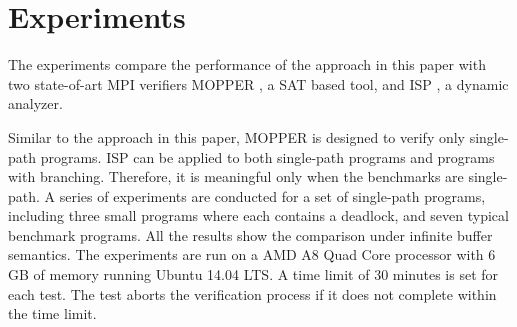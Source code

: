 \section{Experiments}
The experiments compare the performance of the approach in this paper with two state-of-art MPI verifiers MOPPER \cite{DBLP:conf/fm/ForejtKNS14}, a SAT based tool, and ISP \cite{DBLP:conf/ppopp/VakkalankaSGK08,DBLP:conf/sbmf/SharmaGB12}, a dynamic analyzer. 

Similar to the approach in this paper, MOPPER is designed to verify only single-path programs. ISP can be applied to both single-path programs and programs with branching. Therefore, it is meaningful only when the benchmarks are single-path.
A series of experiments are conducted for a set of single-path programs, including three small programs where each contains a deadlock, and seven typical benchmark programs. All the results show the comparison under infinite buffer semantics.  
The experiments are run on a AMD A8 Quad Core processor with 6 GB of memory running Ubuntu 14.04 LTS. A time limit of 30 minutes is set for each test. The test aborts the verification process if it does not complete within the time limit. 


